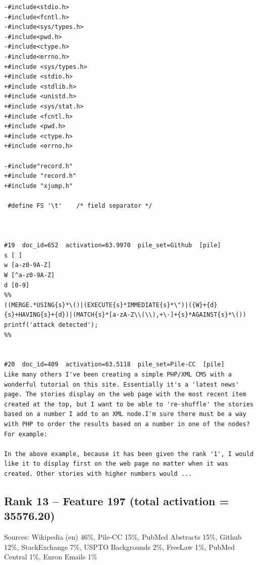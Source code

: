\begin{verbatim}
-#include<stdio.h>
-#include<fcntl.h>
-#include<sys/types.h>
-#include<pwd.h>
-#include<ctype.h>
-#include<errno.h>
+#include <sys/types.h>
+#include <stdio.h>
+#include <stdlib.h>
+#include <unistd.h>
+#include <sys/stat.h>
+#include <fcntl.h>
+#include <pwd.h>
+#include <ctype.h>
+#include <errno.h>
 
-#include"record.h"
+#include "record.h"
+#include "xjump.h"
 
 #define FS	'\t'	/* field separator */
 


#19  doc_id=652  activation=63.9970  pile_set=Github  [pile]
s [ ]
w [a-z0-9A-Z]
W [^a-z0-9A-Z]
d [0-9]
%%
((MERGE.*USING{s}*\()|(EXECUTE{s}*IMMEDIATE{s}*\")|({W}+{d}{s}+HAVING{s}+{d})|(MATCH{s}*[a-zA-Z\\(\\),+\-]+{s}*AGAINST{s}*\()) printf('attack detected');
%%


#20  doc_id=409  activation=63.5118  pile_set=Pile-CC  [pile]
Like many others I've been creating a simple PHP/XML CMS with a wonderful tutorial on this site. Essentially it's a 'latest news' page. The stories display on the web page with the most recent item created at the top, but I want to be able to 're-shuffle' the stories based on a number I add to an XML node.I'm sure there must be a way with PHP to order the results based on a number in one of the nodes? For example:

In the above example, because it has been given the rank '1', I would like it to display first on the web page no matter when it was created. Other stories with higher numbers would ...

\end{verbatim}

\subsection*{Rank 13 -- Feature 197 (total activation = 35576.20)}

Sources: Wikipedia (en) 46\%, Pile-CC 15\%, PubMed Abstracts 15\%, Github 12\%, StackExchange 7\%, USPTO Backgrounds 2\%, FreeLaw 1\%, PubMed Central 1\%, Enron Emails 1\%

